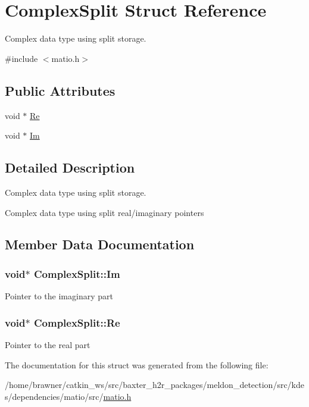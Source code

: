 \hypertarget{structComplexSplit}{\section{Complex\-Split Struct Reference}
\label{structComplexSplit}
}


Complex data type using split storage.  




{\ttfamily \#include $<$matio.\-h$>$}

\subsection*{Public Attributes}
\begin{DoxyCompactItemize}
\item 
void $\ast$ \hyperlink{structComplexSplit_ab9c3f2544c4325a372300d4546e374a8}{Re}
\item 
void $\ast$ \hyperlink{structComplexSplit_abdf9792203bd776fb6be4ceebf078402}{Im}
\end{DoxyCompactItemize}


\subsection{Detailed Description}
Complex data type using split storage. 

Complex data type using split real/imaginary pointers 

\subsection{Member Data Documentation}
\hypertarget{structComplexSplit_abdf9792203bd776fb6be4ceebf078402}{
\subsubsection[{Im}]{\setlength{\rightskip}{0pt plus 5cm}void$\ast$ Complex\-Split\-::\-Im}}\label{structComplexSplit_abdf9792203bd776fb6be4ceebf078402}
Pointer to the imaginary part \hypertarget{structComplexSplit_ab9c3f2544c4325a372300d4546e374a8}{
\subsubsection[{Re}]{\setlength{\rightskip}{0pt plus 5cm}void$\ast$ Complex\-Split\-::\-Re}}\label{structComplexSplit_ab9c3f2544c4325a372300d4546e374a8}
Pointer to the real part 

The documentation for this struct was generated from the following file\-:\begin{DoxyCompactItemize}
\item 
/home/brawner/catkin\-\_\-ws/src/baxter\-\_\-h2r\-\_\-packages/meldon\-\_\-detection/src/kdes/dependencies/matio/src/\hyperlink{matio_8h}{matio.\-h}\end{DoxyCompactItemize}
